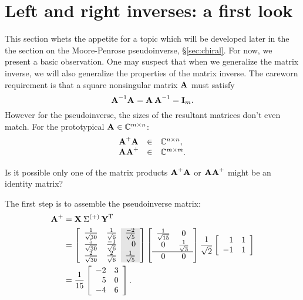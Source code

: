\section[Left and right inverses]{Left and right inverses: a first look}
\label{lrfirst}

This section whets the appetite for a topic which will be developed later in the the section on the Moore-Penrose pseudoinverse, \S\eqref{sec:chiral}. For now, we present a basic observation. One may suspect that when we generalize the matrix inverse, we will also generalize the properties of the matrix inverse. The careworn requirement is that a square nonsingular matrix $\textbf{A}^{\mathrm{}}$ must satisfy
\begin{equation}
  \textbf{A}^{\mathrm{-1}}\textbf{A}^{\mathrm{}} = \textbf{A}^{\mathrm{}}\,\textbf{A}^{\mathrm{-1}} = \textbf{I}_{m}.
\end{equation}
However for the pseudoinverse, the sizes of the resultant matrices don't even match. For the prototypical $\textbf{A}^{\mathrm{}}\in\mathbb{C}^{m \times n}$:
\begin{equation}
  \begin{array}{rcl}
    \operatorname{\textbf{A}^{\mathrm{+}}\textbf{A}^{\mathrm{}}} &\in&\mathbb{C}^{n \times n},\\
    \operatorname{\textbf{A}^{\mathrm{}}\textbf{A}^{\mathrm{+}}} &\in&\mathbb{C}^{m \times m}.
  \end{array}
\end{equation}

Is it possible only one of the matrix products $\operatorname{\textbf{A}^{\mathrm{+}}\textbf{A}^{\mathrm{}}} $ or $\operatorname{\textbf{A}^{\mathrm{}}\textbf{A}^{\mathrm{+}}}$ might be an identity matrix?


The first step is to assemble the pseudoinverse matrix:
\begin{equation}
  \begin{split}
    \mpgia{T} \\
      &=
      \left[
\begin{array}{ cr >{\columncolor{ltgray}}r }
  \frac{1}{\sqrt{30}} & \frac{ 1}{\sqrt{6}} & \frac{-2}{\sqrt{5}}\\
  \frac{5}{\sqrt{30}} & \frac{-1}{\sqrt{6}} & 0 \\
  \frac{2}{\sqrt{30}} & \frac{ 2}{\sqrt{6}} & \frac{ 1}{\sqrt{5}}\\
\end{array}
\right]  
  \mat{cc}
  {
  \frac{1}{\sqrt{15}} & 0\\
  0 & \frac{1}{\sqrt{3}}\\\hline
  0 & 0
  }
  \frac{1}{\sqrt{2}}
  \mat{rr}{1 & 1\\-1 & 1}\\
  &=\frac{1}{15}
  \mat{rr}
  {
 -2 & 3 \\
  5 & 0 \\
 -4 & 6
  }.
  \end{split}
\end{equation}

